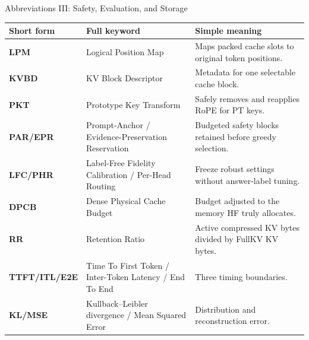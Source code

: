 \documentclass[aspectratio=169,10pt]{beamer}
\begin{document}
\begin{frame}{Abbreviations III: Safety, Evaluation, and Storage}
\scriptsize
\begin{tabularx}{\textwidth}{>{\bfseries}p{}p{}X}
\toprule
Short form & Full keyword & Simple meaning \\
\midrule
LPM & Logical Position Map & Maps packed cache slots to original token positions. \\
KVBD & KV Block Descriptor & Metadata for one selectable cache block. \\
PKT & Prototype Key Transform & Safely removes and reapplies RoPE for PT keys. \\
PAR/EPR & Prompt-Anchor / Evidence-Preservation Reservation & Budgeted safety blocks retained before greedy selection. \\
LFC/PHR & Label-Free Fidelity Calibration / Per-Head Routing & Freeze robust settings without answer-label tuning. \\
DPCB & Dense Physical Cache Budget & Budget adjusted to the memory HF truly allocates. \\
RR & Retention Ratio & Active compressed KV bytes divided by FullKV KV bytes. \\
TTFT/ITL/E2E & Time To First Token / Inter-Token Latency / End To End & Three timing boundaries. \\
KL/MSE & Kullback--Leibler divergence / Mean Squared Error & Distribution and reconstruction error. \\
\bottomrule
\end{tabularx}
\end{frame}
\end{document}
